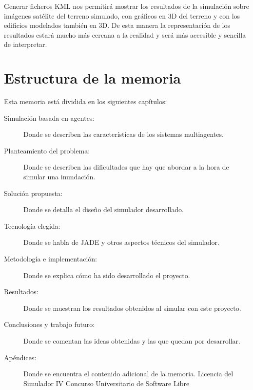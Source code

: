 Generar ficheros KML nos permitirá mostrar los resultados de la simulación
sobre imágenes satélite del terreno simulado, con gráficos en 3D del terreno y
con los edificios modelados también en 3D. De esta manera la representación de
los resultados estará mucho más cercana a la realidad y será más accesible y
sencilla de interpretar.

\section*{Estructura de la memoria}

Esta memoria está dividida en los siguientes capítulos:

\begin{description}
 \item[Simulación basada en agentes:] Donde se describen las características de
los sistemas multiagentes.
 \item[Planteamiento del problema:] Donde se describen las dificultades que hay
que abordar a la hora de simular una inundación.
 \item[Solución propuesta:] Donde se detalla el diseño del simulador
desarrollado.
 \item[Tecnología elegida:] Donde se habla de JADE y otros aspectos
técnicos del simulador.
 \item[Metodología e implementación:] Donde se explica cómo ha sido desarrollado
el proyecto.
 \item[Resultados:] Donde se muestran los resultados obtenidos al simular con
este proyecto.
 \item[Conclusiones y trabajo futuro:] Donde se comentan las ideas obtenidas y
las que quedan por desarrollar.
 \item[Apéndices:] Donde se encuentra el contenido adicional de la memoria.
  \subitem Licencia del Simulador
  \subitem IV Concurso Universitario de Software Libre
\end{description}